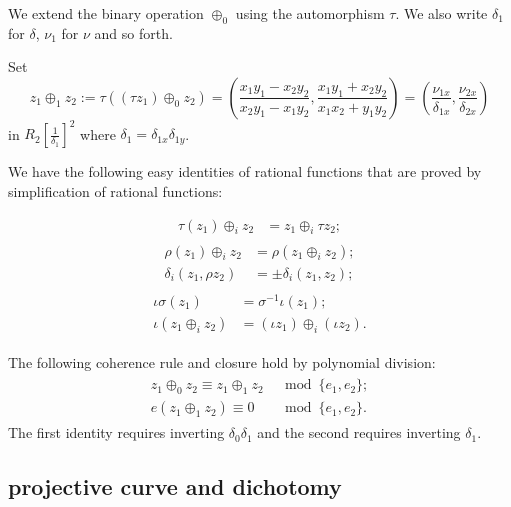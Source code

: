 \documentclass{llncs}
\newcommand{\f}[1]{\frac{1}{#1}}
\begin{document}
We extend the binary operation $\oplus_0$ using the automorphism $\tau$.
We also write $\delta_1$ for
$\delta$, $\nu_1$ for $\nu$ and so forth.

Set
\begin{equation}\label{eqn:tauplus}
  z_1\oplus_1 z_2 := \tau((\tau z_1)\oplus_0 z_2)=
  \left(\frac{x_1y_1 - x_2 y_2}{x_2
    y_1-x_1 y_2},\frac{x_1 y_1 + x_2 y_2}{x_1 x_2 + y_1 y_2}\right) 
= (\frac{\nu_{1x}}{\delta_{1x}},\frac{\nu_{2x}}{\delta_{2x}})
\end{equation}
in $R_2[\f{\delta_1}]^2$ where $\delta_1 = \delta_{1x}\delta_{1y}$.

We have the following easy identities of rational functions that are
proved by simplification of rational functions:

\begin{align}\label{eqn:r-tau}
\tau (z_1)\oplus_i z_2 &= z_1 \oplus_i \tau z_2;
\end{align}
\begin{align}\label{eqn:r-rho}
\begin{split}
\rho(z_1)\oplus_i z_2 &= \rho(z_1\oplus_i z_2);\\
\delta_i(z_1,\rho z_2) &= \pm \delta_i(z_1,z_2);
\end{split}
\end{align}
\begin{align}\label{eqn:r-iota}
\begin{split}
\iota \sigma(z_1) &= \sigma^{-1} \iota (z_1);\\
\iota (z_1\oplus_i z_2) &= (\iota z_1)\oplus_i (\iota z_2).
\end{split}
\end{align}

The following coherence rule and closure hold by polynomial division:
\begin{align}\label{eqn:r-coh}
\begin{split}
z_1 \oplus_0 z_2 \equiv z_1 \oplus_1 z_2 &\mod \{e_1,e_2\};\\
e(z_1\oplus_1 z_2) \equiv 0 &\mod \{e_1,e_2\}.
\end{split}
\end{align}
The first identity requires inverting $\delta_0\delta_1$ and the
second requires inverting $\delta_1$.

\subsection{projective curve and dichotomy}
\end{document}

